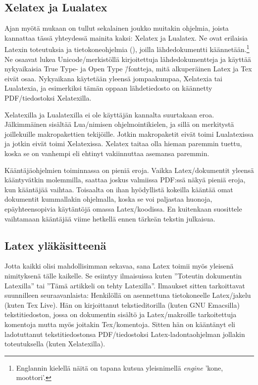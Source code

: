 \subsection{Xelatex ja Lualatex}

Ajan myötä mukaan on tullut sekalainen joukko muitakin ohjelmia, joista
kannattaa tässä yhteydessä mainita kaksi: Xelatex ja Lualatex. Ne ovat
erilaisia Latexin toteutuksia ja tietokone\-ohjelmia (), joilla lähdedokumentti käännetään.\footnote{Englannin
  kielellä näitä on tapana kutsua yleisnimellä
  \emph{\textenglish{engine}} 'kone, moottori'.} Ne osaavat lukea
Unicode\-/merkistöllä kirjoitettuja lähdedokumentteja ja käyttää
nyky\-aikaisia True Type- ja Open Type \=/fontteja, mitä alkuperäinen
Latex ja Tex eivät osaa. Nyky\-aikana käytetään yleensä jompaakumpaa,
Xelatexia tai Lualatexia, ja esimerkiksi tämän oppaan lähdetiedosto on
käännetty PDF\-/tiedostoksi Xelatexilla.

Xelatexilla ja Lualatexilla ei ole käyttäjän kannalta suurtakaan eroa.
Jälkimmäinen sisältää Lua\-/nimisen ohjelmointikielen, ja sillä on
merkitystä joillekuille makropakettien tekijöille. Jotkin makropaketit
eivät toimi Lualatexissa ja jotkin eivät toimi Xelatexissa. Xelatex
taitaa olla hieman paremmin tuettu, koska se on vanhempi eli ehtinyt
vakiinnuttaa asemansa paremmin.

Kääntäjäohjelmien toiminnassa on pieniä eroja. Vaikka Latex\-/dokumentit
yleensä kääntyvätkin molemmilla, saattaa joskus valmiissa PDF:ssä näkyä
pieniä eroja, kun kääntäjää vaihtaa. Toisaalta on ihan hyödyllistä
kokeilla kääntää omat dokumentit kummallakin ohjelmalla, koska se voi
paljastaa huonoja, epäyhteensopivia käytäntöjä omassa Latex\-/koodissa.
En kuitenkaan suosittele vaihtamaan kääntäjää viime hetkellä ennen
tärkeän tekstin julkaisua.

\subsection{Latex yläkäsitteenä}

Jotta kaikki olisi mahdollisimman sekavaa, sana Latex toimii myös
yleisenä nimityksenä tälle kaikelle. Se esiintyy ilmaisuissa kuten
''Toteutin dokumentin Latexilla'' tai ''Tämä artikkeli on tehty
Latexilla''. Ilmaukset sitten tarkoittavat suunnilleen seuraavanlaista:
Henkilöllä on asennettuna tietokoneelle Latex\-/jakelu (kuten Tex Live).
Hän on kirjoittanut teksti\-editorilla (kuten GNU Emacsilla)
tekstitiedoston, jossa on dokumentin sisältö ja Latex\-/makroille
tarkoitettuja komentoja mutta myös joitakin Tex\-/komentoja. Sitten hän
on kääntänyt eli ladotuttanut tekstitiedostonsa PDF\-/tiedostoksi
Latex-la\-don\-ta\-oh\-jel\-man jollakin toteutuksella (kuten
Xelatexilla).

